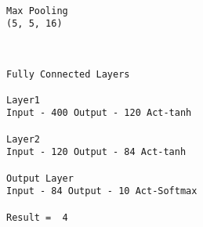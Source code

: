 \documentclass[11pt]{article}
\begin{document}
    \begin{center}
    \end{center}
    { \hspace*{\fill} \\}
    
    \begin{Verbatim}[commandchars=\\\{\}]
Max Pooling
(5, 5, 16)

    \end{Verbatim}

    \begin{center}
    \end{center}
    { \hspace*{\fill} \\}
    
    \begin{Verbatim}[commandchars=\\\{\}]
Fully Connected Layers

Layer1
Input - 400 Output - 120 Act-tanh

Layer2
Input - 120 Output - 84 Act-tanh

Output Layer
Input - 84 Output - 10 Act-Softmax

Result =  4

    \end{Verbatim}


    
    
    
    
\end{document}
